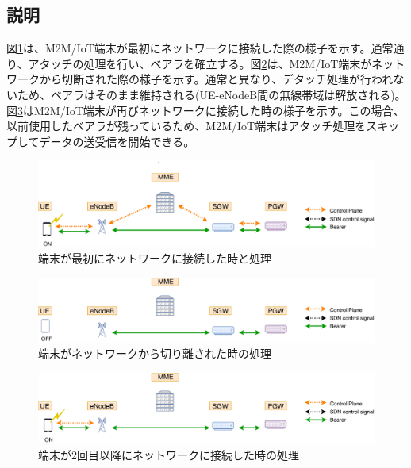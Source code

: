 \documentclass[a4j]{ujarticle}
\begin{document}
\subsection{説明}
図\ref{detach-ON}は、M2M/IoT端末が最初にネットワークに接続した際の様子を示す。通常通り、アタッチの処理を行い、ベアラを確立する。図\ref{detach-OFF}は、M2M/IoT端末がネットワークから切断された際の様子を示す。通常と異なり、デタッチ処理が行われないため、ベアラはそのまま維持される(UE-eNodeB間の無線帯域は解放される)。図\ref{detach-reON}はM2M/IoT端末が再びネットワークに接続した時の様子を示す。この場合、以前使用したベアラが残っているため、M2M/IoT端末はアタッチ処理をスキップしてデータの送受信を開始できる。

\begin{figure}[htbp]
	\centering
	\includegraphics[width=0.7\hsize]{detach-ON.pdf}
  \caption{端末が最初にネットワークに接続した時と処理}
	\label{detach-ON}
\end{figure}

\begin{figure}[htbp]
	\centering
	\includegraphics[width=0.7\hsize]{detach-OFF.pdf}
  \caption{端末がネットワークから切り離された時の処理}
	\label{detach-OFF}
\end{figure}

\begin{figure}[htbp]
	\centering
	\includegraphics[width=0.7\hsize]{detach-reON.pdf}
  \caption{端末が2回目以降にネットワークに接続した時の処理}
	\label{detach-reON}
\end{figure}

\end{document}
